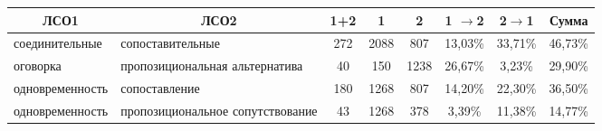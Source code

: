 \begin{multicols}{2}
\begin{table*}
\begin{center}
\begin{tabular}{|l|l|c|c|c|c|c|c|}
\hline
\multicolumn{1}{|c|}{\textbf{ЛСО1}}&\multicolumn{1}{c|}{\textbf{ЛСО2}}&\textbf{1}\;+\;\textbf{2}&\textbf{1}&\textbf{2}&\textbf{1}\;
$\to$\;\textbf{2}&\textbf{2}\;$\to$\;\textbf{1}&\textbf{Сумма}\\
\hline
соединительные&сопоставительные&272\hphantom{9}&2088&807&13,03\%&33,71\%&46,73\%\\
оговорка&пропозициональная альтернатива&40&\hphantom{9}150&1238\hphantom{9}&26,67\%&\hphantom{9}3,23\%&29,90\%\\
одновременность&сопоставление&180\hphantom{9}&1268&807&14,20\%&22,30\%&36,50\%\\
одновременность &пропозициональное 
сопутствование&43&1268&378&\hphantom{9}3,39\%&11,38\%&14,77\%\\
\hline
\end{tabular}
\end{center}
\vspace*{-4pt}
\end{table*}

\begin{table*}[b]\small %
\vspace*{-12pt}
\begin{center}
\vspace*{2ex}


\end{center}
\end{table*}
\end{multicols}

